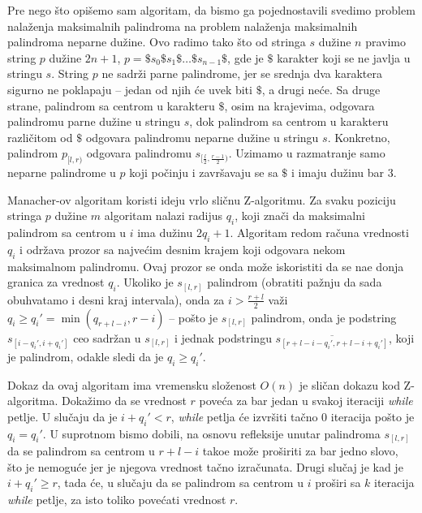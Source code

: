 Pre nego \v sto opi\v semo sam algoritam, da bismo ga pojednostavili svedimo problem nala\v zenja maksimalnih palindroma na problem nala\v zenja maksimalnih palindroma neparne du\v zine. Ovo radimo tako \v sto od stringa $s$ du\v zine $n$ pravimo string $p$ du\v zine $2n+1$, $p = \$s_0\$s_1\$\ldots \$s_{n-1}\$$, gde je $\$$ karakter koji se ne javlja u stringu $s$. String $p$ ne sadr\v zi parne palindrome, jer se srednja dva karaktera sigurno ne poklapaju -- jedan od njih \' ce uvek biti $\$$, a drugi ne\' ce. Sa druge strane, palindrom sa centrom u karakteru $\$$, osim na krajevima, odgovara palindromu parne du\v zine u stringu $s$, dok palindrom sa centrom u karakteru razli\v citom od $\$$ odgovara palindromu neparne du\v zine u stringu $s$. Konkretno, palindrom $p_{[l,r)}$ odgovara palindromu $s_{[\frac{l}{2}, \frac{r-1}{2})}$. Uzimamo u razmatranje samo neparne palindrome u $p$ koji po\v cinju i zavr\v savaju se sa $\$$ i imaju du\v zinu bar $3$.

Manacher-ov algoritam koristi ideju vrlo sli\v cnu Z-algoritmu. Za svaku poziciju stringa $p$ du\v zine $m$ algoritam nalazi radijus $q_i$, koji zna\v ci da maksimalni palindrom sa centrom u $i$ ima du\v zinu $2q_i+1$. Algoritam redom ra\v cuna vrednosti $q_i$ i odr\v zava prozor sa najve\' cim desnim krajem koji odgovara nekom maksimalnom palindromu. Ovaj prozor se onda mo\v ze iskoristiti da se na\dj e donja granica za vrednost $q_i$. Ukoliko je $s_{[l,r]}$ palindrom (obratiti pa\v znju da sada obuhvatamo i desni kraj intervala), onda za $i > \frac{r+l}{2}$ va\v zi $q_i \geq q_i' = \min(q_{r+l-i}, r-i)$ -- po\v sto je $s_{[l,r]}$ palindrom, onda je podstring $s_{[i-q_i', i+q_i']}$ ceo sadr\v zan u $s_{[l,r]}$ i jednak podstringu $\overline{s_{[r+l-i-q_i', r+l-i+q_i']}}$, koji je palindrom, odakle sledi da je $q_i \geq q_i'$.

\noindent
\begin{minipage}[l]{\textwidth}

\end{minipage}

Dokaz da ovaj algoritam ima vremensku slo\v zenost $O(n)$ je sli\v can dokazu kod Z-algoritma. Doka\v zimo da se vrednost $r$ pove\' ca za bar jedan u svakoj iteraciji \textit{while} petlje. U slu\v caju da je $i + q_i' < r$, \textit{while} petlja \' ce izvr\v siti ta\v cno $0$ iteracija po\v sto je $q_i = q_i'$. U suprotnom bismo dobili, na osnovu refleksije unutar palindroma $s_{[l,r]}$ da se palindrom sa centrom u $r+l-i$ tako\dj e mo\v ze pro\v siriti za bar jedno slovo, \v sto je nemogu\' ce jer je njegova vrednost ta\v cno izra\v cunata. Drugi slu\v caj je kad je $i + q_i' \geq r$, tada \' ce, u slu\v caju da se palindrom sa centrom u $i$ pro\v siri sa $k$ iteracija \textit{while} petlje, za isto toliko pove\' cati vrednost $r$. 

